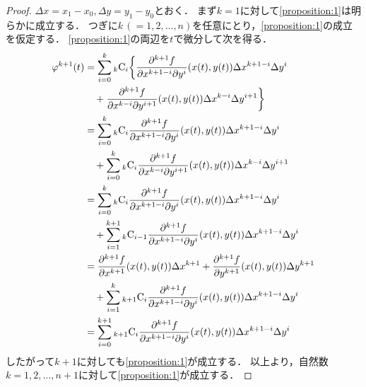 \documentclass[./index]{subfiles}
\begin{document}
\begin{proof}
    $\Delta x = x_1 - x_0, \Delta y = y_1 - y_0$とおく．
    まず$k=1$に対して\cref{proposition:1}は明らかに成立する．
    つぎに$k\,(=1,2,\dots,n)$を任意にとり，\cref{proposition:1}の成立を仮定する．
    \cref{proposition:1}の両辺を$t$で微分して次を得る．
    \begin{alignat}{1}
        \varphi^{k+1}(t) &= 
            \sum_{i=0}^{k}
                {}_{k} \mathrm{C}_{i}
                \bigg\{
                \frac{\partial^{k+1} f}{\partial x^{k+1-i} \partial y^{i}} (x(t), y(t))
                \Delta x^{k+1-i}
                \Delta y^{i} \nonumber \\
        &\quad +
                \frac{\partial^{k+1} f}{\partial x^{k-i} \partial y^{i+1}} (x(t), y(t))
                \Delta x^{k-i}
                \Delta y^{i+1}
                \bigg\} \\
        &= 
            \sum_{i=0}^{k}
                {}_{k} \mathrm{C}_{i}
                \frac{\partial^{k+1} f}{\partial x^{k+1-i} \partial y^{i}} (x(t), y(t))
                \Delta x^{k+1-i}
                \Delta y^{i} \nonumber \\
        &\quad +
            \sum_{i=0}^{k}
                {}_{k} \mathrm{C}_{i}
                \frac{\partial^{k+1} f}{\partial x^{k-i} \partial y^{i+1}} (x(t), y(t))
                \Delta x^{k-i}
                \Delta y^{i+1} \\
        &= 
            \sum_{i=0}^{k}
                {}_{k} \mathrm{C}_{i}
                \frac{\partial^{k+1} f}{\partial x^{k+1-i} \partial y^{i}} (x(t), y(t))
                \Delta x^{k+1-i}
                \Delta y^{i} \nonumber \\
        &\quad +
            \sum_{i=1}^{k+1}
                {}_{k} \mathrm{C}_{i-1}
                \frac{\partial^{k+1} f}{\partial x^{k+1-i} \partial y^{i}} (x(t), y(t))
                \Delta x^{k+1-i}
                \Delta y^{i} \\
        &= 
            \frac{\partial^{k+1} f}{\partial x^{k+1}} (x(t), y(t))
            \Delta x^{k+1}
            +
            \frac{\partial^{k+1} f}{\partial y^{k+1}} (x(t), y(t))
            \Delta y^{k+1} \nonumber \\
        &\quad +
            \sum_{i=1}^{k}
                {}_{k+1} \mathrm{C}_{i}
                \frac{\partial^{k+1} f}{\partial x^{k+1-i} \partial y^{i}} (x(t), y(t))
                \Delta x^{k+1-i}
                \Delta y^{i} \\
        &=
            \sum_{i=0}^{k+1}
                {}_{k+1} \mathrm{C}_{i}
                \frac{\partial^{k+1} f}{\partial x^{k+1-i} \partial y^{i}} (x(t), y(t))
                \Delta x^{k+1-i}
                \Delta y^{i}
    \end{alignat}
    したがって$k+1$に対しても\cref{proposition:1}が成立する．
    以上より，自然数$k=1,2,\dots,n+1$に対して\cref{proposition:1}が成立する．
\end{proof}
\end{document}
